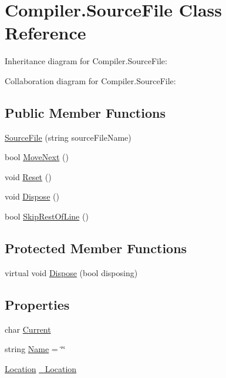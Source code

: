 \hypertarget{class_compiler_1_1_source_file}{}\section{Compiler.\+Source\+File Class Reference}
\label{class_compiler_1_1_source_file}


Inheritance diagram for Compiler.\+Source\+File\+:


Collaboration diagram for Compiler.\+Source\+File\+:
\subsection*{Public Member Functions}
\begin{DoxyCompactItemize}
\item 
\mbox{\hyperlink{class_compiler_1_1_source_file_aba8bb7d1c0418d2b0c6033308209265a}{Source\+File}} (string source\+File\+Name)
\item 
bool \mbox{\hyperlink{class_compiler_1_1_source_file_ad80d0f3a9ead18dce6baad58971838bb}{Move\+Next}} ()
\item 
void \mbox{\hyperlink{class_compiler_1_1_source_file_aa64348e54dbb048b3ec58ce3d355e014}{Reset}} ()
\item 
void \mbox{\hyperlink{class_compiler_1_1_source_file_af5331d15e3c1a629af9cbd273c36c02c}{Dispose}} ()
\item 
bool \mbox{\hyperlink{class_compiler_1_1_source_file_a236483cd300f9793eed183d32959c7bd}{Skip\+Rest\+Of\+Line}} ()
\end{DoxyCompactItemize}
\subsection*{Protected Member Functions}
\begin{DoxyCompactItemize}
\item 
virtual void \mbox{\hyperlink{class_compiler_1_1_source_file_a71c994b257804a95d0f05f7347b10879}{Dispose}} (bool disposing)
\end{DoxyCompactItemize}
\subsection*{Properties}
\begin{DoxyCompactItemize}
\item 
char \mbox{\hyperlink{class_compiler_1_1_source_file_a2d009621871245dfb64d3866ece03633}{Current}}
\item 
string \mbox{\hyperlink{class_compiler_1_1_source_file_a0e304ca0e3d5b0af3dd18d09520f215e}{Name}} = \char`\"{}\char`\"{}
\item 
\mbox{\hyperlink{class_compiler_1_1_location}{Location}} \mbox{\hyperlink{class_compiler_1_1_source_file_a9f6feacf9e20b5b1d535c712d9b4370e}{\+\_\+\+Location}}
\end{DoxyCompactItemize}


